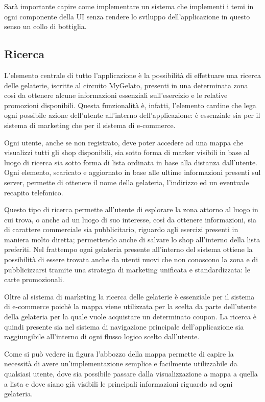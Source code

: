 Sarà importante capire come implementare un sistema che implementi i temi in ogni componente della UI senza rendere lo sviluppo dell'applicazione in questo senso un collo di bottiglia.

\subsection{Ricerca}
L'elemento centrale di tutto l'applicazione è la possibilità di effettuare una ricerca delle gelaterie, iscritte al circuito MyGelato, presenti in una determinata zona così da ottenere alcune informazioni essenziali sull'esercizio e le relative promozioni disponibili.
Questa funzionalità è, infatti, l'elemento cardine che lega ogni possibile azione dell'utente all'interno dell'applicazione: è essenziale sia per il sistema di marketing che per il sistema di e-commerce.

Ogni utente, anche se non registrato, deve poter accedere ad una mappa che visualizzi tutti gli shop disponibili, sia sotto forma di marker visibili in base al luogo di ricerca sia sotto forma di lista ordinata in base alla distanza dall'utente.
Ogni elemento, scaricato e aggiornato in base alle ultime informazioni presenti sul server, permette di ottenere il nome della gelateria, l'indirizzo ed un eventuale recapito telefonico.

Questo tipo di ricerca permette all'utente di esplorare la zona attorno al luogo in cui trova, o anche ad un luogo di suo interesse, così da ottenere informazioni, sia di carattere commerciale sia pubblicitario, riguardo agli esercizi presenti in maniera molto diretta; permettendo anche di salvare lo shop all'interno della lista preferiti.
Nel frattempo ogni gelateria presente all'interno del sistema ottiene la possibilità di essere trovata anche da utenti nuovi che non conoscono la zona e di pubblicizzarsi tramite una strategia di marketing unificata e standardizzata: le carte promozionali.

Oltre al sistema di marketing la ricerca delle gelaterie è essenziale per il sistema di e-commerce poichè la mappa viene utilizzata per la scelta da parte dell'utente della gelateria per la quale vuole acquistare un determinato coupon.
La ricerca è quindi presente sia nel sistema di navigazione principale dell'applicazione sia raggiungibile all'interno di ogni flusso logico scelto dall'utente.

Come si può vedere in figura l'abbozzo della mappa permette di capire la necessità di avere un'implementazione semplice e facilmente utilizzabile da qualsiasi utente, dove sia possibile passare dalla visualizzazione a mappa a quella a lista e dove siano già visibili le principali informazioni riguardo ad ogni gelateria.


